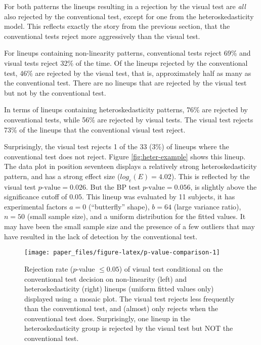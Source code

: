 \documentclass[]{interact}
\theoremstyle{plain}%
\theoremstyle{definition}
\theoremstyle{remark}
\begin{document}
For both patterns the lineups resulting in a rejection by the visual
test are \emph{all} also rejected by the conventional test, except for
one from the heteroskedasticity model. This reflects exactly the story
from the previous section, that the conventional tests reject more
aggressively than the visual test.

For lineups containing non-linearity patterns, conventional tests reject
69\% and visual tests reject 32\% of the time. Of the lineups rejected
by the conventional test, 46\% are rejected by the visual test, that is,
approximately half as many as the conventional test. There are no
lineups that are rejected by the visual test but not by the conventional
test.

In terms of lineups containing heteroskedasticity patterns, 76\% are
rejected by conventional tests, while 56\% are rejected by visual tests.
The visual test rejects 73\% of the lineups that the conventional visual
test reject.

Surprisingly, the visual test rejects 1 of the 33 (3\%) of lineups where
the conventional test does not reject. Figure \ref{fig:heter-example}
shows this lineup. The data plot in position seventeen displays a
relatively strong heteroskedasticity pattern, and has a strong effect
size (\(log_e(E)=4.02\)). This is reflected by the visual test
\(p\text{-value} = 0.026\). But the BP test \(p\text{-value} = 0.056\),
is slightly above the significance cutoff of \(0.05\). This lineup was
evaluated by 11 subjects, it has experimental factors \(a = 0\)
(``butterfly'' shape), \(b = 64\) (large variance ratio), \(n = 50\)
(small sample size), and a uniform distribution for the fitted values.
It may have been the small sample size and the presence of a few
outliers that may have resulted in the lack of detection by the
conventional test.

\begin{figure}

{\centering \texttt{[image: paper\_files/figure-latex/p-value-comparison-1]} 

}

\caption{Rejection rate ($p$-value $\leq0.05$) of visual test conditional on the conventional test decision on non-linearity (left) and heteroskedasticity (right) lineups (uniform fitted values only) displayed using a mosaic plot. The visual test rejects less frequently than the conventional test, and (almost) only rejects when the conventional test does. Surprisingly, one lineup in the heteroskedasticity group is rejected by the visual test but NOT the conventional test.}\label{fig:p-value-comparison}
\end{figure}
\end{document}
